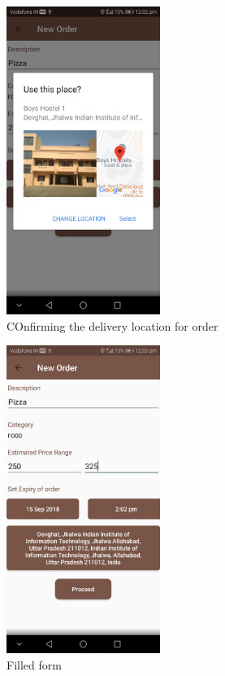\documentclass{report}
\begin{document}
\begin{figure}[h!]
\begin{subfigure}[h!]{.3\textwidth}
\centering
\includegraphics[width=5cm]{place.jpg}
\caption{\centering \tiny COnfirming the delivery location for order}
\end{subfigure}
\begin{subfigure}[h!]{.3\textwidth}
\centering
\includegraphics[width=5cm]{filled_form.jpg}
\caption{\centering \tiny Filled form}
\end{subfigure}
\begin{subfigure}[h!]{.3\textwidth}
\centering

\end{subfigure}
\end{figure}
\end{document}
